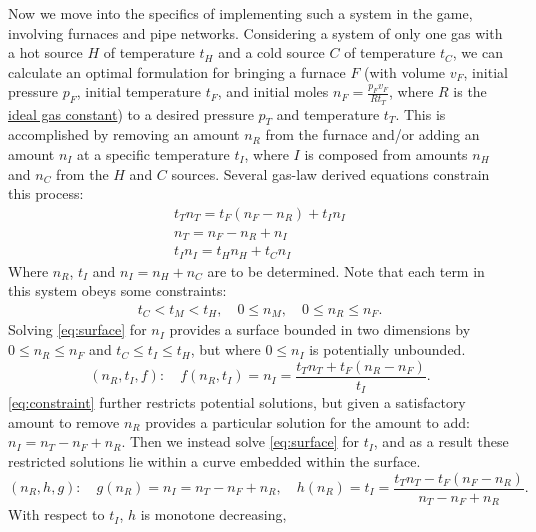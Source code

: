 \documentclass{article}
\begin{document}
Now we move into the specifics of implementing such a system in the game,
involving furnaces and pipe networks.
Considering a system of only one gas with
a hot source $H$ of temperature $t_H$ and
a cold source $C$ of temperature $t_C$,
we can calculate an optimal formulation for bringing a furnace $F$
(with volume $v_F$, initial pressure $p_F$, initial temperature $t_F$,
and initial moles $n_F=\frac{p_F v_F}{R t_T}$, where
$R$ is the \href{https://en.wikipedia.org/wiki/Gas_constant}{ideal gas constant})
to a desired pressure $p_T$ and temperature $t_T$.
This is accomplished by removing an amount $n_R$ from the furnace and/or adding
an amount $n_I$ at a specific temperature $t_I$, where $I$ is composed from
amounts $n_H$ and $n_C$ from the $H$ and $C$ sources.
Several gas-law derived equations constrain this process:
\begin{gather}
    t_T n_T = t_F(n_F-n_R)+t_I n_I \label{eq:surface} \\
    n_T = n_F-n_R+n_I \label{eq:constraint} \\
    t_I n_I = t_H n_H+t_C n_I \label{eq:added}
\end{gather}
Where $n_R$, $t_I$ and $n_I=n_H+n_C$ are to be determined.
Note that each term in this system obeys some constraints:
\begin{gather*}
    t_C<t_M<t_H,\quad
    0\le n_M,\quad
    0\le n_R\le n_F.
\end{gather*}
Solving \autoref{eq:surface} for $n_I$ provides
a surface bounded in two dimensions
by $0\le n_R\le n_F$ and $t_C\le t_I\le t_H$,
but where $0\le n_I$ is potentially unbounded.
\[
    (n_R,t_I,f):\quad
    f(n_R,t_I) = n_I = \frac{t_T n_T+t_F(n_R-n_F)}{t_I}.
\]
\autoref{eq:constraint} further restricts potential solutions, but
given a satisfactory amount to remove $n_R$ provides a particular solution
for the amount to add: $n_I=n_T-n_F+n_R$.
Then we instead solve \autoref{eq:surface} for $t_I$,
and as a result these restricted solutions lie
within a curve embedded within the surface.
\[
    (n_R,h,g):\quad
    g(n_R) = n_I = n_T-n_F+n_R,\quad
    h(n_R) = t_I = \frac{t_T n_T-t_F(n_F-n_R)}{n_T-n_F+n_R}.
\]
\noindent
With respect to $t_I$, $h$ is monotone decreasing,
\end{document}
